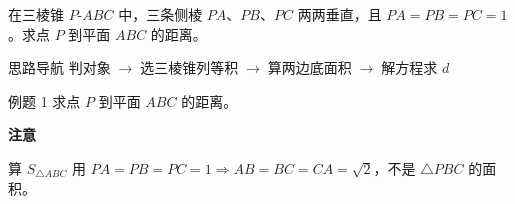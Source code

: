 \documentclass{exam-zh}
\begin{document}
\begin{eduProblemBlock}[例题 1]
在三棱锥 $P\text{-}ABC$ 中，三条侧棱 $PA$、$PB$、$PC$ 两两垂直，且 $PA=PB=PC=1$。求点 $P$ 到平面 $ABC$ 的距离。
\end{eduProblemBlock}





\begin{eduAuxItem}{思路导航}
判对象$\;\to\;$选三棱锥列等积$\;\to\;$算两边底面积$\;\to\;$解方程求 $d$\end{eduAuxItem}




\begin{eduSubQuestionItem}{例题 1}
求点 $P$ 到平面 $ABC$ 的距离。\end{eduSubQuestionItem}

\begin{eduDualExplain}
  \begin{eduExplainLeft}
  \end{eduExplainLeft}

  \begin{eduExplainRight}
    \vspace{1mm}
    {\color{edu-blue}\bfseries\small 注意}\par\vspace{1mm}
    \begin{eduBulletList}
      \item 算 $S_{\triangle ABC}$ 用 $PA=PB=PC=1\Rightarrow AB=BC=CA=\sqrt2$，不是 $\triangle PBC$ 的面积。    \end{eduBulletList}
  \end{eduExplainRight}
\end{eduDualExplain}
\end{document}
